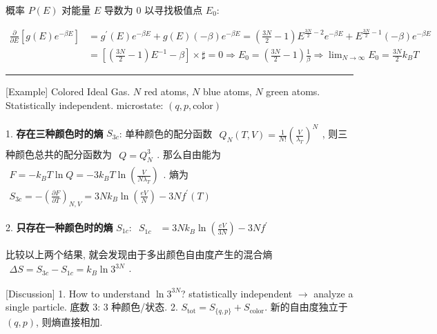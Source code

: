 \documentclass[../../main.tex]{subfiles}
\begin{document}
概率 $P(E)$ 对能量 $E$ 导数为 $0$ 以寻找极值点 $E_{0}$: 

$\begin{aligned}
    \frac{\partial}{\partial E}\left[g(E)e^{-\beta E}\right] &= g^{\prime}(E)e^{-\beta E} + g(E)(-\beta)e^{-\beta E} = \left(\frac{3N}{2}-1\right)E^{\frac{3N}{2}-2}e^{-\beta E} + E^{\frac{3N}{2}-1}(-\beta)e^{-\beta E}\\
    &= \left[\left(\frac{3N}{2}-1\right)E^{-1} - \beta\right]\times \sharp = 0\Rightarrow  E_{0} = \left(\frac{3N}{2}-1\right)\frac{1}{\beta}\Rightarrow \lim_{N\rightarrow \infty}E_{0} = \frac{3N}{2}k_{B}T
\end{aligned}$

\vspace{0.5em}\hrule\vspace{0.5em}

[Example] Colored Ideal Gas. $N$ red atoms, $N$ blue atoms, $N$ green atoms. Statistically independent.  microstate: $(q,p,\text{color})$

1. \textbf{存在三种颜色时的熵} $S_{3c}$: 单种颜色的配分函数 $\begin{aligned}
    Q_{N}(T,V) = \frac{1}{N!}\left(\frac{V}{\lambda_{T}}\right)^{N}
\end{aligned}$, 则三种颜色总共的配分函数为 $\begin{aligned}
    Q = Q_{N}^{3}
\end{aligned}$. 那么自由能为 $\begin{aligned}
    F = -k_{B}T\ln{Q} = -3k_{B}T\ln{\left(\frac{V}{N\lambda_{T}}\right)}
\end{aligned}$. 熵为 $\begin{aligned}
    S_{3c} = -\left(\frac{\partial F}{\partial T}\right)_{N,V} = 3Nk_{B}\ln{\left(\frac{eV}{N}\right)} - 3Nf^{\prime}(T)
\end{aligned}$

2. \textbf{只存在一种颜色时的熵} $S_{1c}$: $\begin{aligned}
    S_{1c} &= 3Nk_{B}\ln{\left(\frac{eV}{3N}\right)} - 3Nf^{\prime}
\end{aligned}$

比较以上两个结果, 就会发现由于多出颜色自由度产生的混合熵 $\begin{aligned}
    \Delta S = S_{3c} - S_{1c} = k_{B}\ln{3^{3N}}
\end{aligned}$. 

[Discussion] 1. How to understand $\ln{3^{3N}}$? statistically independent $\rightarrow$ analyze a single particle. 底数 $3$: 3 种颜色/状态. 2. $S_{\text{tot}} = S_{\{q,p\}} + S_{\text{color}}$. 新的自由度独立于 $(q,p)$, 则熵直接相加.
\end{document}
